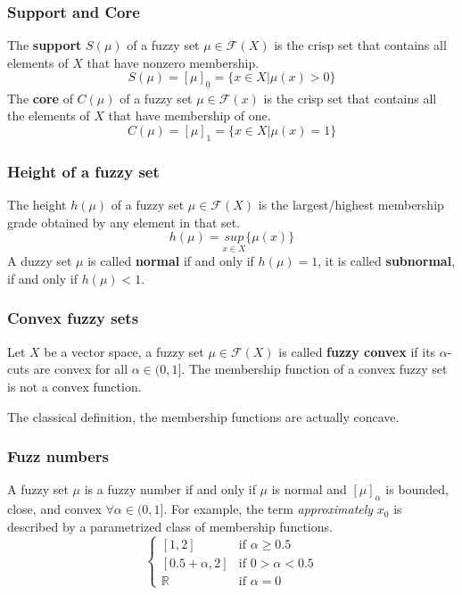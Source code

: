 \documentclass{article}
\begin{document}
\subsubsection{Support and Core}
The \textbf{support} $S(\mu)$ of a fuzzy set $\mu\in\mathcal{F}(X)$ is the crisp set that contains all elements
of $X$ that have nonzero membership.
$$S(\mu)=[\mu]_{\underline{0}}=\{x\in X|\mu(x)>0\}$$
The \textbf{core} of $C(\mu)$ of a fuzzy set $\mu\in\mathcal{F}(x)$ is the crisp set that contains
all the elements of $X$ that have membership of one.
$$C(\mu)=[\mu]_1=\{x\in X|\mu(x)=1\}$$

\subsubsection{Height of a fuzzy set}
The height $h(\mu)$ of a fuzzy set $\mu\in\mathcal{F}(X)$ is the largest/highest membership grade obtained
by any element in that set.
$$h(\mu)=\underset{x\in X}{sup}\{\mu(x)\}$$
A duzzy set $\mu$ is called \textbf{normal} if and only if $h(\mu)=1$, it is called \textbf{subnormal},
if and only if $h(\mu)<1$.

\subsubsection{Convex fuzzy sets}
Let $X$ be a vector space, a fuzzy set $\mu\in\mathcal{F}(X)$ is called \textbf{fuzzy convex}
if its $\alpha$-cuts are convex for all $\alpha\in (0,1]$. The membership function of a convex fuzzy
set is not a convex function.

The classical definition, the membership functions are actually concave.

\subsubsection{Fuzz numbers}
A fuzzy set $\mu$ is a fuzzy number if and only if $\mu$ is normal and $[\mu]_\alpha$ is bounded, close,
and convex $\forall\alpha\in (0,1]$.
For example, the term \textit{approximately} $x_0$ is described by a parametrized class of membership
functions.
\[
    \begin{cases}
        [1,2]          & \text{if }\alpha\geq 0.5 \\
        [0.5+\alpha,2] & \text{if } 0>\alpha<0.5  \\
        \mathbb{R}     & \text{if }\alpha =0
    \end{cases}
\]
\end{document}
